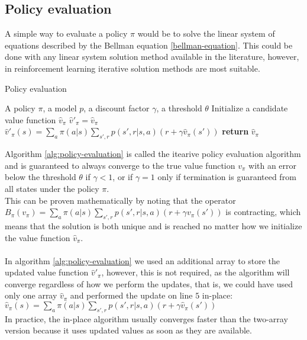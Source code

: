 \subsection{Policy evaluation}
A simple way to evaluate a policy $\pi$ would be to solve the linear system of equations described by the Bellman equation \ref{bellman-equation}. This could be done with any linear system solution method available in the literature, however, in reinforcement learning iterative solution methods are most suitable.
\begin{algorithm}[H]
    \caption{Policy evaluation}
    \label{alg:policy-evaluation}
    \begin{algorithmic}[1]
        \Require A policy $\pi$, a model $p$, a discount factor $\gamma$, a threshold $\theta$
        \State Initialize a candidate value function $\hat{v}_{\pi}$
            \State $\hat{v}'_{\pi} = \hat{v}_{\pi}$
                \State $\hat{v}'_{\pi}(s) = \sum_a \pi(a | s) \sum_{s', r} p(s', r | s, a) (r + \gamma \hat{v}_{\pi}(s'))$
            \EndFor
                \State \textbf{return} $\hat{v}_{\pi}$
            \EndIf
        \EndWhile
    \end{algorithmic}
\end{algorithm}
Algorithm \ref{alg:policy-evaluation} is called the itearive policy evaluation algorithm and is guaranteed to always converge to the true value function $v_{\pi}$ with an error below the threshold $\theta$ if $\gamma < 1$, or if $\gamma = 1$ only if termination is guaranteed from all states under the policy $\pi$.\\
This can be proven mathematically by noting that the operator $B_{\pi}(v_{\pi}) = \sum_a \pi(a | s) \sum_{s', r} p(s', r | s, a) (r + \gamma v_{\pi}(s'))$ is contracting, which means that the solution is both unique and is reached no matter how we initialize the value function $\hat{v}_{\pi}$.\\\\
In algorithm \ref{alg:policy-evaluation} we used an additional array to store the updated value function $\hat{v}'_{\pi}$, however, this is not required, as the algorithm will converge regardless of how we perform the updates, that is, we could have used only one array $\hat{v}_{\pi}$ and performed the update on line $5$ in-place:\\
$\hat{v}_{\pi}(s) = \sum_a \pi(a | s) \sum_{s', r} p(s', r | s, a) (r + \gamma \hat{v}_{\pi}(s'))$\\
In practice, the in-place algorithm usually converges faster than the two-array version because it uses updated values as soon as they are available.

